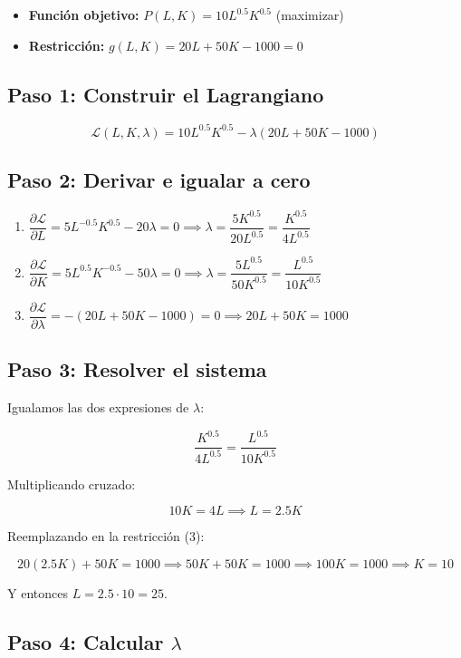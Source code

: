 \documentclass[12pt]{article}
\begin{document}
\begin{itemize}
    \item \textbf{Función objetivo:} $P(L, K) = 10 L^{0.5} K^{0.5}$ (maximizar)
    \item \textbf{Restricción:} $g(L, K) = 20L + 50K - 1000 = 0$
\end{itemize}

\subsection{Paso 1: Construir el Lagrangiano}

\[
\mathcal{L}(L, K, \lambda) = 10 L^{0.5} K^{0.5} - \lambda(20L + 50K - 1000)
\]

\subsection{Paso 2: Derivar e igualar a cero}

\begin{enumerate}
    \item $\dfrac{\partial \mathcal{L}}{\partial L} = 5 L^{-0.5} K^{0.5} - 20\lambda = 0 \implies \lambda = \dfrac{5 K^{0.5}}{20 L^{0.5}} = \dfrac{K^{0.5}}{4 L^{0.5}}$
    \item $\dfrac{\partial \mathcal{L}}{\partial K} = 5 L^{0.5} K^{-0.5} - 50\lambda = 0 \implies \lambda = \dfrac{5 L^{0.5}}{50 K^{0.5}} = \dfrac{L^{0.5}}{10 K^{0.5}}$
    \item $\dfrac{\partial \mathcal{L}}{\partial \lambda} = -(20L + 50K - 1000) = 0 \implies 20L + 50K = 1000$
\end{enumerate}

\subsection{Paso 3: Resolver el sistema}

Igualamos las dos expresiones de $\lambda$:

\[
\frac{K^{0.5}}{4 L^{0.5}} = \frac{L^{0.5}}{10 K^{0.5}}
\]

Multiplicando cruzado:

\[
10 K = 4 L \implies L = 2.5 K
\]

Reemplazando en la restricción (3):

\[
20(2.5K) + 50K = 1000 \implies 50K + 50K = 1000 \implies 100K = 1000 \implies K = 10
\]

Y entonces $L = 2.5 \cdot 10 = 25$.

\subsection{Paso 4: Calcular $\lambda$}
\end{document}
